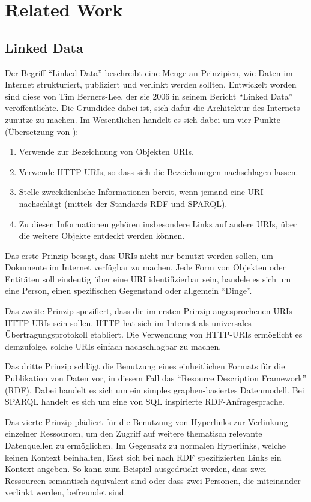 \section{Related Work}


\subsection{Linked Data}

Der Begriff “Linked Data” beschreibt eine Menge an Prinzipien, wie Daten im Internet strukturiert, publiziert und verlinkt werden sollten. Entwickelt worden sind diese von Tim Berners-Lee, der sie 2006 in seinem Bericht “Linked Data” \cite{linked_data} veröffentlichte. Die Grundidee dabei ist, sich dafür die Architektur des Internets zunutze zu machen. Im Wesentlichen handelt es sich dabei um vier Punkte (Übersetzung von \cite{wiki_linked_data}):
\begin{enumerate}
\item Verwende zur Bezeichnung von Objekten URIs.
\item Verwende HTTP-URIs, so dass sich die Bezeichnungen nachschlagen lassen.
\item Stelle zweckdienliche Informationen bereit, wenn jemand eine URI nachschlägt (mittels der Standards RDF und SPARQL).
\item Zu diesen Informationen gehören insbesondere Links auf andere URIs, über die weitere Objekte entdeckt werden können.
\end{enumerate}

Das erste Prinzip besagt, dass URIs nicht nur benutzt werden sollen, um Dokumente im Internet verfügbar zu machen. Jede Form von Objekten oder Entitäten soll eindeutig über eine URI identifizierbar sein, handele es sich um eine Person, einen spezifischen Gegenstand oder allgemein “Dinge”.


Das zweite Prinzip spezifiert, dass die im ersten Prinzip angesprochenen URIs HTTP-URIs sein sollen. HTTP hat sich im Internet als universales Übertragungsprotokoll etabliert. Die Verwendung von HTTP-URIs ermöglicht es demzufolge, solche URIs einfach nachschlagbar zu machen.


Das dritte Prinzip schlägt die Benutzung eines einheitlichen Formats für die Publikation von Daten vor, in diesem Fall das “Resource Description Framework” (RDF). Dabei handelt es sich um ein simples graphen-basiertes Datenmodell. Bei SPARQL handelt es sich um eine von SQL inspirierte RDF-Anfragesprache.


Das vierte Prinzip plädiert für die Benutzung von Hyperlinks zur Verlinkung einzelner Ressourcen, um den Zugriff auf weitere thematisch relevante Datenquellen zu ermöglichen. Im Gegensatz zu normalen Hyperlinks, welche keinen Kontext beinhalten, lässt sich bei nach RDF spezifizierten Links ein Kontext angeben. So kann zum Beispiel ausgedrückt werden, dass zwei Ressourcen semantisch äquivalent sind oder dass zwei Personen, die miteinander verlinkt werden, befreundet sind.


